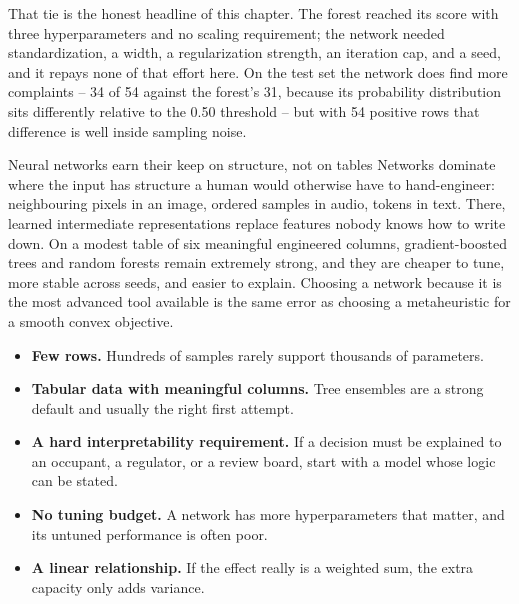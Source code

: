 That tie is the honest headline of this chapter. The forest reached its score
with three hyperparameters and no scaling requirement; the network needed
standardization, a width, a regularization strength, an iteration cap, and a
seed, and it repays none of that effort here. On the test set the network does
find more complaints -- 34 of 54 against the forest's 31, because its probability
distribution sits differently relative to the 0.50 threshold -- but with 54
positive rows that difference is well inside sampling noise.

\begin{ExplainBox}{Neural networks earn their keep on structure, not on tables}
Networks dominate where the input has structure a human would otherwise have to
hand-engineer: neighbouring pixels in an image, ordered samples in audio, tokens
in text. There, learned intermediate representations replace features nobody
knows how to write down. On a modest table of six meaningful engineered columns,
gradient-boosted trees and random forests remain extremely strong, and they are
cheaper to tune, more stable across seeds, and easier to explain. Choosing a
network because it is the most advanced tool available is the same error as
choosing a metaheuristic for a smooth convex objective.
\end{ExplainBox}


\begin{itemize}
    \item \textbf{Few rows.} Hundreds of samples rarely support thousands of
          parameters.
    \item \textbf{Tabular data with meaningful columns.} Tree ensembles are a
          strong default and usually the right first attempt.
    \item \textbf{A hard interpretability requirement.} If a decision must be
          explained to an occupant, a regulator, or a review board, start with a
          model whose logic can be stated.
    \item \textbf{No tuning budget.} A network has more hyperparameters that
          matter, and its untuned performance is often poor.
    \item \textbf{A linear relationship.} If the effect really is a weighted sum,
          the extra capacity only adds variance.
\end{itemize}

\label{sec:c21-application}

